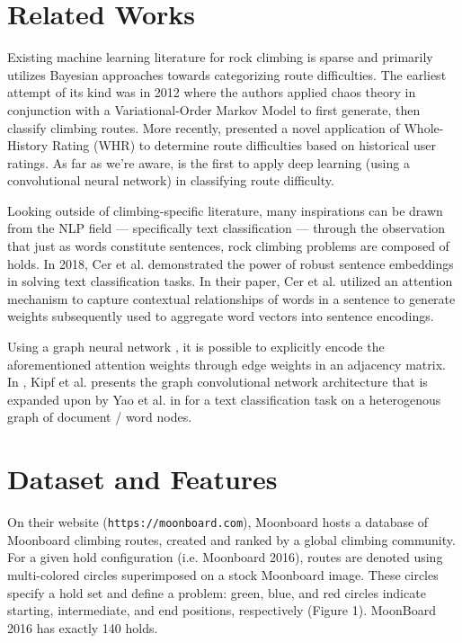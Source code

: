 \documentclass{article}
\begin{document}
\section{Related Works}
Existing machine learning literature for rock climbing is sparse and primarily utilizes Bayesian approaches towards categorizing route difficulties. The earliest attempt of its kind was in 2012 \cite{Phillips_2012} where the authors applied chaos theory in conjunction with a Variational-Order Markov Model to first generate, then classify climbing routes. More recently, \cite{scarff2020estimation} presented a novel application of Whole-History Rating (WHR) \cite{RemiCoulomWHR} to determine route difficulties based on historical user ratings. As far as we're aware, \cite{DoblesCS229} is the first to apply deep learning (using a convolutional neural network) in classifying route difficulty.

Looking outside of climbing-specific literature, many inspirations can be drawn from the NLP field --- specifically text classification --- through the observation that just as words constitute sentences, rock climbing problems are composed of holds. In 2018, Cer et al. \cite{cer2018universal} demonstrated the power of robust sentence embeddings in solving text classification tasks. In their paper, Cer et al. utilized an attention mechanism to capture contextual relationships of words in a sentence to generate weights subsequently used to aggregate word vectors into sentence encodings. 

Using a graph neural network \cite{battaglia2018relational}, it is possible to explicitly encode the aforementioned attention weights through edge weights in an adjacency matrix. In \cite{kipf2016semisupervised}, Kipf et al. presents the graph convolutional network architecture that is expanded upon by Yao et al. in \cite{yao2018graph} for a text classification task on a heterogenous graph of document / word nodes.

\section{Dataset and Features}
On their website (\texttt{https://moonboard.com}), Moonboard hosts a database of Moonboard climbing routes, created and ranked by a global climbing community. For a given hold configuration (i.e. Moonboard 2016), routes are denoted using multi-colored circles superimposed on a stock Moonboard image. These circles specify a hold set and define a problem: green, blue, and red circles indicate starting, intermediate, and end positions, respectively (Figure 1). MoonBoard 2016 has exactly 140 holds.
\end{document}
